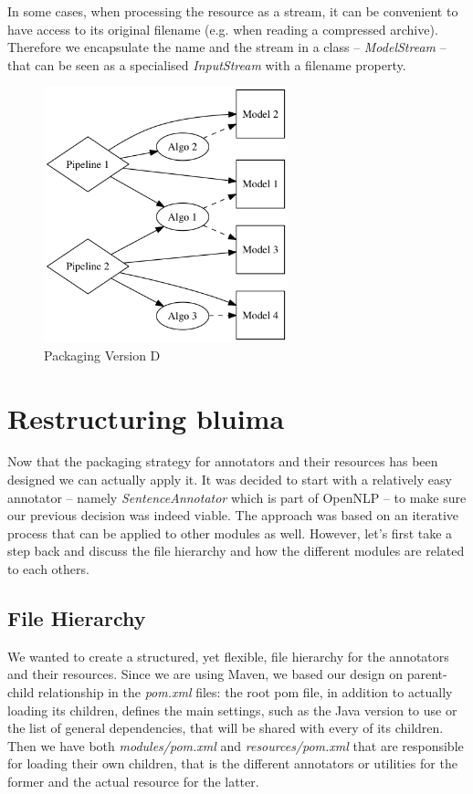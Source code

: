 \documentclass{article}
\newcommand{\id}[1]{\mbox{\textit{#1}}}
\begin{document}
In some cases, when processing the resource as a stream, it can be convenient to have access to its original filename (e.g. when reading a compressed archive). Therefore we encapsulate the name and the stream in a class -- \id{ModelStream} -- that can be seen as a specialised \id{InputStream} with a filename property.

\begin{figure}
\centering
\includegraphics[width=200pt]{res/packaging_version_D.png}
\caption{Packaging Version D}
\label{fig:pkgsysD}
\end{figure}


\section{Restructuring bluima}
\label{sec:restructuring_bluima}

Now that the packaging strategy for annotators and their resources has been designed we can actually apply it. It was decided to start with a relatively easy annotator -- namely \id{SentenceAnnotator} which is part of OpenNLP -- to make sure our previous decision was indeed viable. The approach was based on an iterative process that can be applied to other modules as well. However, let's first take a step back and discuss the file hierarchy and how the different modules are related to each others.

\subsection{File Hierarchy}

We wanted to create a structured, yet flexible, file hierarchy for the annotators and their resources. Since we are using Maven, we based our design on parent-child relationship in the \id{pom.xml} files: the root pom file, in addition to actually loading its children, defines the main settings, such as the Java version to use or the list of general dependencies, that will be shared with every of its children. Then we have both \id{modules/pom.xml} and \id{resources/pom.xml} that are responsible for loading their own children, that is the different annotators or utilities for the former and the actual resource for the latter.
\end{document}
